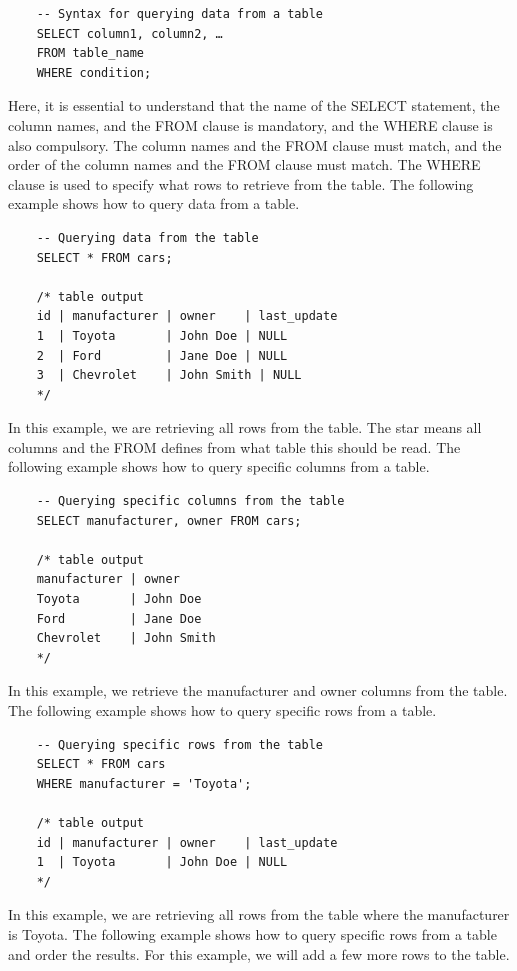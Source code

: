 \begin{verbatim}
    -- Syntax for querying data from a table
    SELECT column1, column2, …
    FROM table_name
    WHERE condition;
\end{verbatim}

Here, it is essential to understand that the name of the SELECT statement, the column names, and the FROM clause is mandatory, and the WHERE clause is also compulsory. The column names and the FROM clause must match, and the order of the column names and the FROM clause must match. The WHERE clause is used to specify what rows to retrieve from the table. The following example shows how to query data from a table.

\begin{verbatim}
    -- Querying data from the table
    SELECT * FROM cars;

    /* table output
    id | manufacturer | owner    | last_update
    1  | Toyota       | John Doe | NULL
    2  | Ford         | Jane Doe | NULL
    3  | Chevrolet    | John Smith | NULL
    */
\end{verbatim}

In this example, we are retrieving all rows from the table. The star means all columns and the FROM defines from what table this should be read. The following example shows how to query specific columns from a table.

\begin{verbatim}
    -- Querying specific columns from the table
    SELECT manufacturer, owner FROM cars;

    /* table output
    manufacturer | owner
    Toyota       | John Doe
    Ford         | Jane Doe
    Chevrolet    | John Smith
    */
\end{verbatim}

In this example, we retrieve the manufacturer and owner columns from the table. The following example shows how to query specific rows from a table.

\begin{verbatim}
    -- Querying specific rows from the table
    SELECT * FROM cars
    WHERE manufacturer = 'Toyota';

    /* table output
    id | manufacturer | owner    | last_update
    1  | Toyota       | John Doe | NULL
    */
\end{verbatim}

In this example, we are retrieving all rows from the table where the manufacturer is Toyota. The following example shows how to query specific rows from a table and order the results. For this example, we will add a few more rows to the table.

